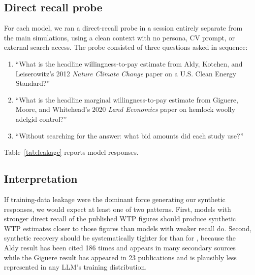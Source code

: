 \documentclass[12pt]{article}
\begin{document}
\subsection{Direct recall probe}

For each model, we ran a direct-recall probe in a session entirely
separate from the main simulations, using a clean context with no persona,
CV prompt, or external search access. The probe consisted of three questions asked in sequence:

\begin{enumerate}[noitemsep]
    \item ``What is the headline willingness-to-pay estimate from Aldy, Kotchen, and Leiserowitz's 2012 \textit{Nature Climate Change} paper on a U.S. Clean Energy Standard?''
    \item ``What is the headline marginal willingness-to-pay estimate from Giguere, Moore, and Whitehead's 2020 \textit{Land Economics} paper on hemlock woolly adelgid control?''
    \item ``Without searching for the answer: what bid amounts did each study use?''
\end{enumerate}

Table~\ref{tab:leakage} reports model responses.

\label{tab:leakage}

\subsection{Interpretation}

If training-data leakage were the dominant force generating our synthetic responses, we would expect at least one of two patterns. First, models with stronger direct recall of the published WTP figures should produce synthetic WTP estimates closer to those figures than models with weaker recall do. Second, synthetic recovery should be systematically tighter for \textcite{Aldy2012} than for \textcite{Giguere2020}, because the Aldy result has been cited 186 times and appears in many secondary sources while the Giguere result has appeared in 23 publications and is plausibly less represented in any LLM's training distribution.
\end{document}
